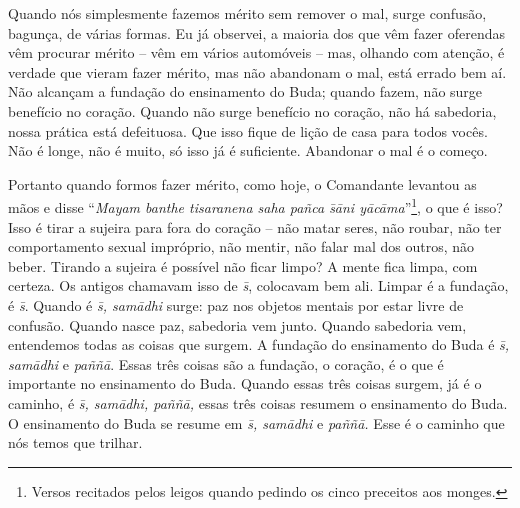 Quando nós simplesmente fazemos mérito sem remover o mal, surge
confusão, bagunça, de várias formas. Eu já observei, a maioria dos que
vêm fazer oferendas vêm procurar mérito – vêm em vários automóveis –
mas, olhando com atenção, é verdade que vieram fazer mérito, mas não
abandonam o mal, está errado bem aí. Não alcançam a fundação do
ensinamento do Buda; quando fazem, não surge benefício no coração.
Quando não surge benefício no coração, não há sabedoria, nossa prática
está defeituosa. Que isso fique de lição de casa para todos vocês. Não
é longe, não é muito, só isso já é suficiente. Abandonar o mal é o
começo.

Portanto quando formos fazer mérito, como hoje, o Comandante
levantou as mãos e disse “\textit{Mayam banthe tisaranena saha pañca
s\=\il\=ani y\=ac\=ama}”\footnote{Versos recitados pelos leigos quando
pedindo os cinco preceitos aos monges. }, o que é isso? Isso é tirar a
sujeira para fora do coração – não matar seres, não
roubar, não ter comportamento sexual impróprio, não mentir, não falar
mal dos outros, não beber. Tirando a sujeira é possível não ficar
limpo? A mente fica limpa, com certeza. Os antigos chamavam isso de
\textit{s\=\ila}, colocavam bem ali. Limpar é a fundação, é
\textit{s\=\ila}. Quando é \textit{s\=\ila, sam\=adhi} surge: paz nos
objetos mentais por estar livre de confusão. Quando nasce paz,
sabedoria vem junto. Quando sabedoria vem, entendemos todas as coisas
que surgem. A fundação do ensinamento do Buda é \textit{s\=\ila,
sam\=adhi }e\textit{ paññ\=a}. Essas três coisas são a fundação, o
coração, é o que é importante no ensinamento do Buda. Quando essas três
coisas surgem, já é o caminho, é \textit{s\=\ila, sam\=adhi, paññ\=a,}
essas três coisas resumem o ensinamento do Buda. O ensinamento do Buda
se resume em \textit{s\=\ila, sam\=adhi }e\textit{ paññ\=a.} Esse é o
caminho que nós temos que trilhar. 

